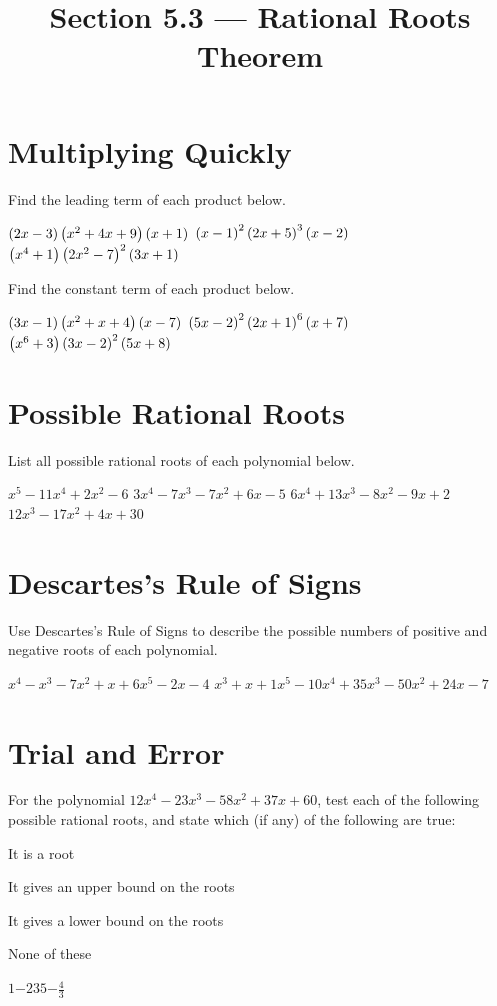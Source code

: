 

\title{Section 5.3 --- Rational Roots Theorem}


\maketitle

\section*{Multiplying Quickly}
Find the leading term of each product below.
\begin{smenum}
\mitemxxx
{$\left(2x-3\right)\left(x^2+4x+9\right)\left(x+1\right)$}
{$\left(x-1\right)^2\left(2x+5\right)^3\left(x-2\right)$}
{$\left(x^4+1\right)\left(2x^2-7\right)^2\left(3x+1\right)$}
\end{smenum}
Find the constant term of each product below.
\begin{smenum}
\mitemxxx
{$\left(3x-1\right)\left(x^2+x+4\right)\left(x-7\right)$}
{$\left(5x-2\right)^2\left(2x+1\right)^6\left(x+7\right)$}
{$\left(x^6+3\right)\left(3x-2\right)^2\left(5x+8\right)$}
\end{smenum}

\section*{Possible Rational Roots}
List all possible rational roots of each polynomial below.
\begin{smenum}
\mitemxx
{$x^5-11x^4+2x^2-6$}
{$3x^4-7x^3-7x^2+6x-5$}
\mitemxx
{$6x^4+13x^3-8x^2-9x+2$}
{$12x^3-17x^2+4x+30$}
\end{smenum}

\section*{Descartes's Rule of Signs}
Use Descartes's Rule of Signs to describe the possible numbers of positive and negative roots of each polynomial.
\begin{smenum}
\mitemxx
{$x^4-x^3-7x^2+x+6$}{$x^5-2x-4$}
\mitemxx
{$x^3+x+1$}{$x^5-10x^4+35x^3-50x^2+24x-7$}
\end{smenum}

\section*{Trial and Error}
For the polynomial $12x^4-23x^3-58x^2+37x+60$, test each of the following possible rational roots, and state which (if any) of the following are true:
\begin{clist}
\item It is a root
\item It gives an upper bound on the roots
\item It gives a lower bound on the roots
\item None of these
\end{clist}
\begin{smenum}
\mitemxxxxx
{$1$}{$-2$}{$3$}{$5$}{$-\frac{4}{3}$}
\end{smenum}

